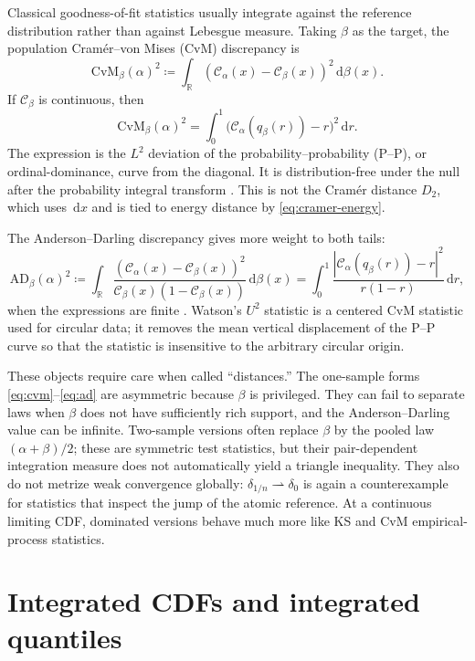 \documentclass[11pt]{article}
\newcommand{\RR}{\mathbb R}
\renewcommand{\d}{\,\mathrm d}
\newcommand{\al}{\alpha}
\newcommand{\be}{\beta}
\newcommand{\de}{\delta}
\newcommand{\Cc}{\mathcal C}
\newcommand{\cumul}[1]{\Cc_{#1}}
\newcommand{\eqdef}{\coloneqq}
\begin{document}
Classical goodness-of-fit statistics usually integrate against the reference
distribution rather than against Lebesgue measure.  Taking $\be$ as the
target, the population Cram\'er--von Mises (CvM) discrepancy is
\begin{equation}\label{eq:cvm}
 \mathrm{CvM}_{\be}(\al)^2
 \eqdef\int_\RR(\cumul{\al}(x)-\cumul{\be}(x))^2\d\be(x).
\end{equation}
If $\cumul{\be}$ is continuous, then
\begin{equation}\label{eq:cvm-pp}
 \mathrm{CvM}_{\be}(\al)^2
 =\int_0^1\big(\cumul{\al}(q_\be(r))-r\big)^2\d r.
\end{equation}
The expression is the $L^2$ deviation of the probability--probability (P--P),
or ordinal-dominance, curve from the diagonal.  It is distribution-free under
the null after the probability integral transform
\cite{ShorackWellner1986}.  This is not the Cram\'er distance $D_2$, which uses
$\d x$ and is tied to energy distance by \eqref{eq:cramer-energy}.

The Anderson--Darling discrepancy gives more weight to both tails:
\begin{equation}\label{eq:ad}
 \mathrm{AD}_{\be}(\al)^2
 \eqdef\int_\RR
 \frac{(\cumul{\al}(x)-\cumul{\be}(x))^2}
 {\cumul{\be}(x)(1-\cumul{\be}(x))}\d\be(x)
 =\int_0^1\frac{|\cumul{\al}(q_\be(r))-r|^2}{r(1-r)}\d r,
\end{equation}
when the expressions are finite \cite{AndersonDarling1952}.  Watson's
$U^2$ statistic is a centered CvM statistic used for circular data; it removes
the mean vertical displacement of the P--P curve so that the statistic is
insensitive to the arbitrary circular origin.

These objects require care when called ``distances.''  The one-sample forms
\eqref{eq:cvm}--\eqref{eq:ad} are asymmetric because $\be$ is privileged.  They
can fail to separate laws when $\be$ does not have sufficiently rich support,
and the Anderson--Darling value can be infinite.  Two-sample versions often
replace $\be$ by the pooled law $(\al+\be)/2$; these are symmetric test
statistics, but their pair-dependent integration measure does not
automatically yield a triangle inequality.  They also do not metrize weak
convergence globally: $\de_{1/n}\rightharpoonup\de_0$ is again a
counterexample for statistics that inspect the jump of the atomic reference.
At a continuous limiting CDF, dominated versions behave much more like KS and
CvM empirical-process statistics.

\section{Integrated CDFs and integrated quantiles}
\end{document}
